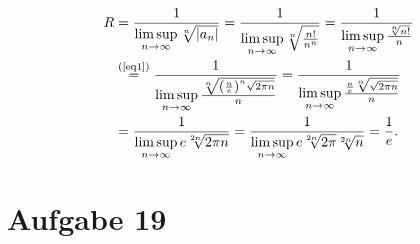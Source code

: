 \documentclass[12pt,a4paper]{article}
\begin{document}
\begin{enumerate}[(a)]
    \begin{align*}
        R &= \frac{1}{\limsup\limits_{n \to \infty} \sqrt[n]{|a_n|}}
        = \frac{1}{\limsup\limits_{n \to \infty} \sqrt[n]{\frac{n!}{n^n}}}
        = \frac{1}{\limsup\limits_{n \to \infty} \frac{\sqrt[n]{n!}}{n}}\\
        &\overset{\text{(\ref{eq1})}}{=} \frac{1}{\limsup\limits_{n \to \infty} \frac{\sqrt[n]{\left(\frac{n}{e}\right)^n\sqrt{2 \pi n}}}{n}}
        = \frac{1}{\limsup\limits_{n \to \infty} \frac{\frac{n}{e} \sqrt[n]{\sqrt{2 \pi n}}}{n}}\\
        &= \frac{1}{\limsup\limits_{n \to \infty} e \sqrt[2n]{2 \pi n}}
        = \frac{1}{\limsup\limits_{n \to \infty} e \sqrt[2n]{2\pi} \sqrt[2n]{n}}
        = \frac{1}{e}.
    \end{align*}
\end{enumerate}


\section*{Aufgabe 19}
\end{document}
